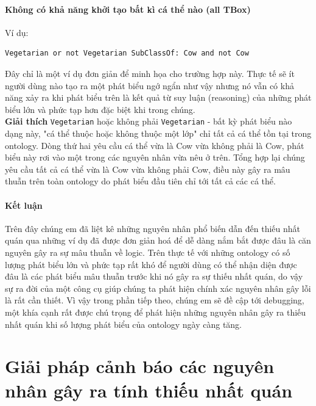 \paragraph{Không có khả năng khởi tạo bất kì cá thể nào (all TBox)}
Ví dụ:
\begin{verbatim}
Vegetarian or not Vegetarian SubClassOf: Cow and not Cow
\end{verbatim}
Đây chỉ là một ví dụ đơn giản để minh họa cho trường hợp này. Thực tế sẽ ít người dùng nào tạo ra một phát biểu ngớ ngẩn như vậy nhưng nó vẫn có khả năng xảy ra khi phát biểu trên là kết quả từ suy luận (reasoning) của những phát biểu lớn và phức tạp hơn đặc biệt khi trong chúng.
\\
\textbf{Giải thích} \texttt{Vegetarian} hoặc không phải \texttt{Vegetarian} - bất kỳ phát biểu nào dạng này, "cá thể thuộc hoặc không thuộc một lớp" chỉ tất cả cá thể tồn tại trong ontology. Dòng thứ hai yêu cầu cá thể vừa là Cow vừa không phải là Cow, phát biểu này rơi vào một trong các nguyên nhân vừa nêu ở trên. Tổng hợp lại chúng yêu cầu tất cả cá thể vừa là Cow vừa không phải Cow, điều này gây ra mâu thuẫn trên toàn ontology do phát biểu đầu tiên chỉ tới tất cả các cá thể.

\paragraph{Kết luận}
Trên đây chúng em đã liệt kê những nguyên nhân phổ biến dẫn đến thiếu nhất quán qua những ví dụ đã được đơn giản hoá để dễ dàng nắm bắt được đâu là căn nguyên gây ra sự mâu thuẫn về logic. Trên thực tế với những ontology có số lượng phát biểu lớn và phức tạp rất khó để người dùng có thể nhận diện được đâu là các phát biểu mâu thuẫn trước khi nó gây ra sự thiếu nhất quán, do vậy sự ra đời của một công cụ giúp chúng ta phát hiện chính xác nguyên nhân gây lỗi là rất cần thiết. Vì vậy trong phần tiếp theo, chúng em sẽ đề cập tới debugging, một khía cạnh rất được chú trọng để phát hiện những nguyên nhân gây ra thiếu nhất quán khi số lượng phát biểu của ontology ngày càng tăng.

\section{Giải pháp cảnh báo các nguyên nhân gây ra tính thiếu nhất quán}

